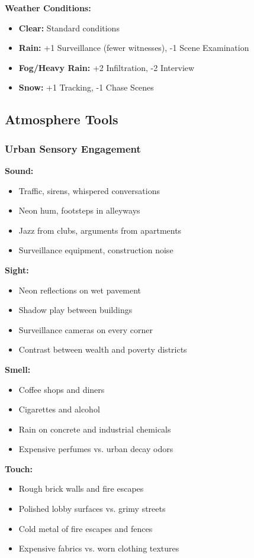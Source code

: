 \documentclass[11pt]{article}
\begin{document}
\textbf{Weather Conditions:}
\begin{itemize}
\item \textbf{Clear:} Standard conditions
\item \textbf{Rain:} +1 Surveillance (fewer witnesses), -1 Scene Examination
\item \textbf{Fog/Heavy Rain:} +2 Infiltration, -2 Interview
\item \textbf{Snow:} +1 Tracking, -1 Chase Scenes
\end{itemize}

\subsection{Atmosphere Tools}

\subsubsection{Urban Sensory Engagement}

\textbf{Sound:}
\begin{itemize}
\item Traffic, sirens, whispered conversations
\item Neon hum, footsteps in alleyways
\item Jazz from clubs, arguments from apartments
\item Surveillance equipment, construction noise
\end{itemize}

\textbf{Sight:}
\begin{itemize}
\item Neon reflections on wet pavement
\item Shadow play between buildings
\item Surveillance cameras on every corner
\item Contrast between wealth and poverty districts
\end{itemize}

\textbf{Smell:}
\begin{itemize}
\item Coffee shops and diners
\item Cigarettes and alcohol
\item Rain on concrete and industrial chemicals
\item Expensive perfumes vs. urban decay odors
\end{itemize}

\textbf{Touch:}
\begin{itemize}
\item Rough brick walls and fire escapes
\item Polished lobby surfaces vs. grimy streets
\item Cold metal of fire escapes and fences
\item Expensive fabrics vs. worn clothing textures
\end{itemize}
\end{document}

